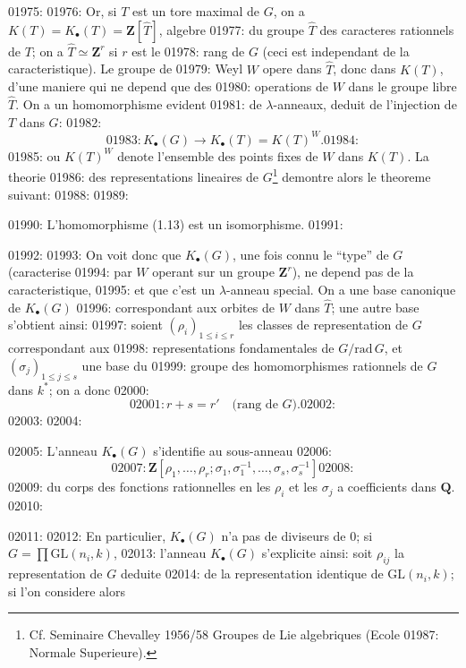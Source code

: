 01975: 
01976: Or, si $T$ est un tore maximal de $G$, on a $K(T) = K_{\bullet}(T) = \mathbf{Z}[\hat{T}]$, algebre
01977: du groupe $\hat{T}$ des caracteres rationnels de $T$; on a $\hat{T} \simeq \mathbf{Z}^r$ si $r$ est le
01978: rang de $G$ (ceci est independant de la caracteristique). Le groupe de
01979: Weyl $W$ opere dans $\hat{T}$, donc dans $K(T)$, d'une maniere qui ne depend que des
01980: operations de $W$ dans le groupe libre $\hat{T}$. On a un homomorphisme evident
01981: de $\lambda$-anneaux, deduit de l'injection de $T$ dans $G$:
01982: \begin{equation}
01983: K_{\bullet}(G) \longrightarrow K_{\bullet}(T) = K(T)^W.
01984: \end{equation}
01985: ou $K(T)^W$ denote l'ensemble des points fixes de $W$ dans $K(T)$. La theorie
01986: des representations lineaires de $G$\footnote{Cf. Seminaire Chevalley 1956/58 Groupes de Lie algebriques (Ecole
01987: Normale Superieure).} demontre alors le theoreme suivant:
01988: 
01989: \begin{theorem}
01990: L'homomorphisme (1.13) est un isomorphisme.
01991: \end{theorem}
01992: 
01993: On voit donc que $K_{\bullet}(G)$, une fois connu le ``type'' de $G$ (caracterise
01994: par $W$ operant sur un groupe $\mathbf{Z}^r$), ne depend pas de la caracteristique,
01995: et que c'est un $\lambda$-anneau special. On a une base canonique de $K_{\bullet}(G)$
01996: correspondant aux orbites de $W$ dans $\hat{T}$; une autre base s'obtient ainsi:
01997: soient $(\rho_i)_{1 \leq i \leq r}$ les classes de representation de $G$ correspondant aux
01998: representations fondamentales de $G/\mathrm{rad}\, G$, et $(\sigma_j)_{1 \leq j \leq s}$ une base du
01999: groupe des homomorphismes rationnels de $G$ dans $k^{*}$; on a donc
02000: \[
02001: r + s = r' \quad \text{(rang de } G\text{)}.
02002: \]
02003: 
02004: \begin{corollary}
02005: L'anneau $K_{\bullet}(G)$ s'identifie au sous-anneau
02006: \[
02007: \mathbf{Z}[\rho_1, \ldots, \rho_r; \sigma_1, \sigma_1^{-1}, \ldots, \sigma_s, \sigma_s^{-1}]
02008: \]
02009: du corps des fonctions rationnelles en les $\rho_i$ et les $\sigma_j$ a coefficients dans $\mathbf{Q}$.
02010: \end{corollary}
02011: 
02012: En particulier, $K_{\bullet}(G)$ n'a pas de diviseurs de 0; si $G = \prod \mathrm{GL}(n_i, k)$,
02013: l'anneau $K_{\bullet}(G)$ s'explicite ainsi: soit $\rho_{ij}$ la representation de $G$ deduite
02014: de la representation identique de $\mathrm{GL}(n_i, k)$; si l'on considere alors
